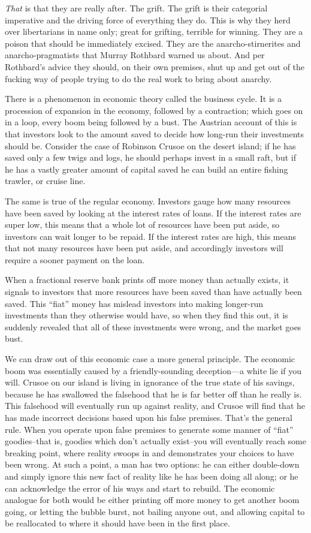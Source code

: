 \documentclass[11pt]{article}
\begin{document}
\emph{That} is that they are really after. The grift. The grift is their categorial imperative and the driving force of everything they do. This is why they herd over libertarians in name only; great for grifting, terrible for winning. They are a poison that should be immediately excised. They are the anarcho-stirnerites and anarcho-pragmatists that Murray Rothbard warned us about. And per Rothbard's advice they should, on their own premises, shut up and get out of the fucking way of people trying to do the real work to bring about anarchy.

There is a phenomenon in economic theory called the business cycle. It is a procession of expansion in the economy, followed by a contraction; which goes on in a loop, every boom being followed by a bust. The Austrian account of this is that investors look to the amount saved to decide how long-run their investments should be. Consider the case of Robinson Crusoe on the desert island; if he has saved only a few twigs and logs, he should perhaps invest in a small raft, but if he has a vastly greater amount of capital saved he can build an entire fishing trawler, or cruise line.

The same is true of the regular economy. Investors gauge how many resources have been saved by looking at the interest rates of loans. If the interest rates are super low, this means that a whole lot of resources have been put aside, so investors can wait longer to be repaid. If the interest rates are high, this means that not many resources have been put aside, and accordingly investors will require a sooner payment on the loan.

When a fractional reserve bank prints off more money than actually exists, it signals to investors that more resources have been saved than have actually been saved. This ``fiat'' money has mislead investors into making longer-run investments than they otherwise would have, so when they find this out, it is suddenly revealed that all of these investments were wrong, and the market goes bust.

We can draw out of this economic case a more general principle. The economic boom was essentially caused by a friendly-sounding deception---a white lie if you will. Crusoe on our island is living in ignorance of the true state of his savings, because he has swallowed the falsehood that he is far better off than he really is. This falsehood will eventually run up against reality, and Crusoe will find that he has made incorrect decisions based upon his false premises. That's the general rule. When you operate upon false premises to generate some manner of ``fiat'' goodies--that is, goodies which don't actually exist--you will eventually reach some breaking point, where reality swoops in and demonstrates your choices to have been wrong. At such a point, a man has two options: he can either double-down and simply ignore this new fact of reality like he has been doing all along; or he can acknowledge the error of his ways and start to rebuild. The economic analogue for both would be either printing off more money to get another boom going, or letting the bubble burst, not bailing anyone out, and allowing capital to be reallocated to where it should have been in the first place.
\end{document}
